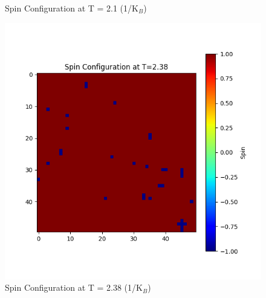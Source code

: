 \documentclass[11pt]{article}
\begin{document}
\begin{figure}[H]
\begin{minipage}{0.32\textwidth}
        \caption{Spin Configuration at T = 2.1 (1/K$_B$)}
        \label{fig:5}
    \end{minipage}\hfill
    \begin{minipage}{0.32\textwidth}
        \centering
        \includegraphics[width=\textwidth]{Spin_Configuration_at_T=2.38.png}
        \caption{Spin Configuration at T = 2.38 (1/K$_B$)}
        \label{fig:6}
    \end{minipage}
\end{figure}
\end{document}
